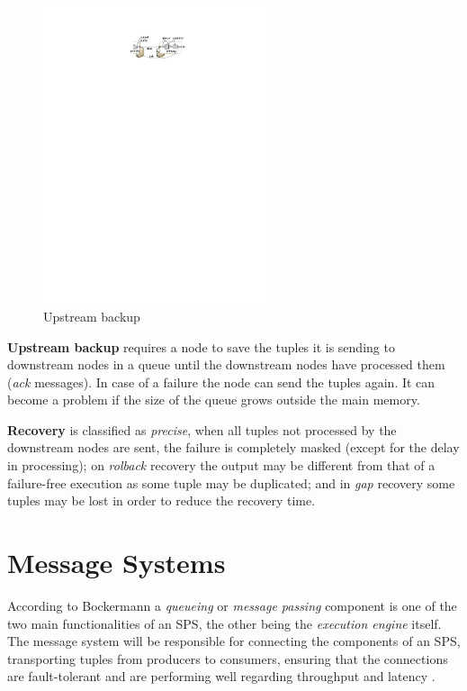 \documentclass[ppgc,diss,english]{iiufrgs}
\begin{document}
\begin{figure}[!ht]
	\centering
	\includegraphics[width=0.6\textwidth]{images/fault_tolerance/upstream_backup.pdf}
	\caption[Upstream backup]{Upstream backup \cite{balazinska2009fault}}
	\label{fig:upstream_backup}
\end{figure}


\textbf{Upstream backup} requires a node to save the tuples it is sending to downstream nodes in a queue until the downstream nodes have processed them (\emph{ack} messages). In case of a failure the node can send the tuples again. It can become a problem if the size of the queue grows outside the main memory.

\textbf{Recovery} is classified as \emph{precise}, when all tuples not processed by the downstream nodes are sent, the failure is completely masked (except for the delay in processing); on \emph{rolback} recovery the output may be different from that of a failure-free execution as some tuple may be duplicated; and in \emph{gap} recovery some tuples may be lost in order to reduce the recovery time.


\section{Message Systems}
\label{sec:esp:data_transport}

According to Bockermann \cite{bockermann2014survey} a \emph{queueing} or \emph{message passing} component is one of the two main functionalities of an SPS, the other being the \emph{execution engine} itself. The message system will be responsible for connecting the components of an SPS, transporting tuples from producers to consumers, ensuring that the connections are fault-tolerant and are performing well regarding throughput and latency \cite{andrade2014fundamentals}.
\end{document}
